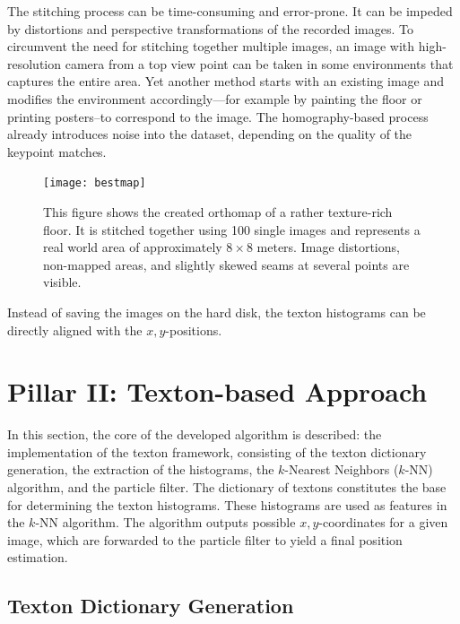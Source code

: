 \documentclass{report}
\begin{document}
The stitching process can be time-consuming and error-prone. It can be
impeded by distortions and perspective transformations of the recorded
images. To circumvent the need for stitching together multiple images,
an image with high-resolution camera from a top view point can be
taken in some environments that captures the entire area. Yet another
method starts with an existing image and modifies the environment
accordingly---for example by painting the floor or printing
posters--to correspond to the image.
The homography-based process already introduces noise into the
dataset, depending on the quality of the keypoint matches.
\begin{figure}[h!]
\begin{center}
\texttt{[image: bestmap]}
\caption{{\label{fig:orthomap}
This figure shows
    the created orthomap of a rather texture-rich floor. It is
    stitched together using 100 single images and represents a
    real world area of approximately $8\times8$ meters. Image
    distortions, non-mapped areas, and slightly skewed seams at
    several points are visible.%
}}
\end{center}
\end{figure}

Instead of saving the images on the hard disk, the texton histograms
can be directly aligned with the $x,y$-positions.

\section{Pillar II: Texton-based Approach}
\label{sec:textons}

In this section, the core of the developed algorithm is described: the
implementation of the texton framework, consisting of the texton
dictionary generation, the extraction of the histograms, the
$k$-Nearest Neighbors ($k$-NN) algorithm, and the particle filter. The
dictionary of textons constitutes the base for determining the texton
histograms. These histograms are used as features in the $k$-NN
algorithm. The algorithm outputs possible $x,y$-coordinates for a
given image, which are forwarded to the particle filter to yield a
final position estimation.

\subsection{Texton Dictionary Generation}
\label{sec:text-dict-gener}
\end{document}

